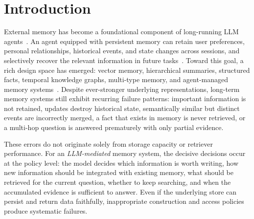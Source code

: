 \documentclass[11pt]{article}
\begin{document}


\section{Introduction}
\label{sec:intro}

External memory has become a foundational component of long-running LLM
agents~\cite{packer2023memgpt,du2026survey}. An agent equipped with persistent
memory can retain user preferences, personal relationships, historical events,
and state changes across sessions, and selectively recover the relevant
information in future tasks~\cite{park2023generative,wu2024longmemeval,
maharana2024locomo}. Toward this goal, a rich design space has emerged: vector
memory, hierarchical summaries, structured facts, temporal knowledge graphs,
multi-type memory, and agent-managed memory systems~\cite{packer2023memgpt,
zhang2025amem,chattopadhyay2025mem0,chen2025memoryos,vlasic2025mirix,zhu2025graphiti}.
Despite ever-stronger underlying representations, long-term memory systems still
exhibit recurring failure patterns: important information is not retained,
updates destroy historical state, semantically similar but distinct events are
incorrectly merged, a fact that exists in memory is never retrieved, or a
multi-hop question is answered prematurely with only partial evidence.

These errors do not originate solely from storage capacity or retriever
performance. For an \emph{LLM-mediated} memory system, the decisive decisions
occur at the policy level: the model decides which information is worth writing,
how new information should be integrated with existing memory, what should be
retrieved for the current question, whether to keep searching, and when the
accumulated evidence is sufficient to answer. Even if the underlying store can
persist and return data faithfully, inappropriate construction and access
policies produce systematic failures.
\end{document}
